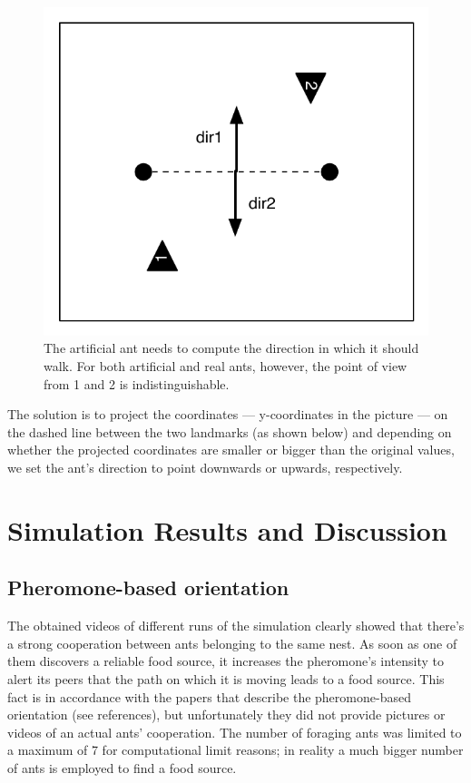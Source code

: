 \documentclass[11pt]{article}
\begin{document}
\begin{figure}[h!]
  \centering
    \includegraphics[width=.6\textwidth]{images/ambiguous_direction}
     \caption{The artificial ant needs to compute the direction in which it should walk. For both artificial and real ants, however, the point of view from 1 and 2 is indistinguishable.}
\end{figure}

The solution is to project the coordinates --- y-coordinates in the picture --- on the dashed line between the two landmarks (as shown below) and depending on whether the projected coordinates are smaller or bigger than the original values, we set the ant's direction to point downwards or upwards, respectively.
\newpage
\section{Simulation Results and Discussion}

\subsection{Pheromone-based orientation}
The obtained videos of different runs of the simulation clearly showed that there's a strong cooperation between ants belonging to the same nest. As soon as one of them discovers a reliable food source, it increases the pheromone's intensity to alert its peers that the path on which it is moving leads to a food source. This fact is in accordance with the papers that describe the pheromone-based orientation (see references), but unfortunately they did not provide pictures or videos of an actual ants' cooperation. The number of foraging ants was limited to a maximum of 7 for computational limit reasons; in reality a much bigger number of ants is employed to find a food source.
\end{document}
